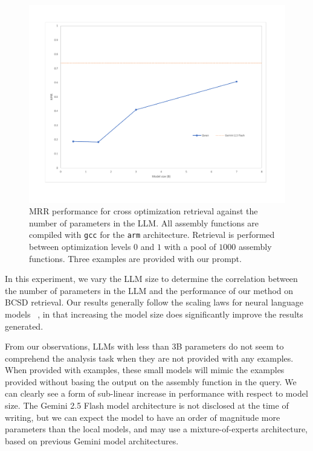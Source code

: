 \begin{figure}
\centerline{\includegraphics[width=\linewidth]{size-ablation}}
\caption{MRR performance for cross optimization retrieval against the number of parameters in the LLM. All assembly functions are compiled
with \texttt{gcc} for the \texttt{arm} architecture. Retrieval is performed between optimization levels \(0\) and \(1\) with a pool of \(1000\) assembly functions.
Three examples are provided with our prompt.}
\label{size-abl}
\end{figure}

In this experiment, we vary the LLM size to determine the correlation between the number of parameters in the LLM and the performance
of our method on BCSD retrieval. Our results generally follow the scaling laws for neural language models ~\cite{scaling-laws}, in that increasing
the model size does significantly improve the results generated.

From our observations, LLMs with less than \(3\)B parameters do not seem to comprehend the analysis task when
they are not provided with any examples. When provided with examples, these small models will mimic the examples provided without basing the
output on the assembly function in the query. We can clearly see a form of sub-linear increase in performance with respect to model size.
The Gemini 2.5 Flash model architecture is not disclosed at the time of writing, but we can expect the model to have an order
of magnitude more parameters than the local models, and may use a mixture-of-experts architecture, based on previous Gemini model architectures.

